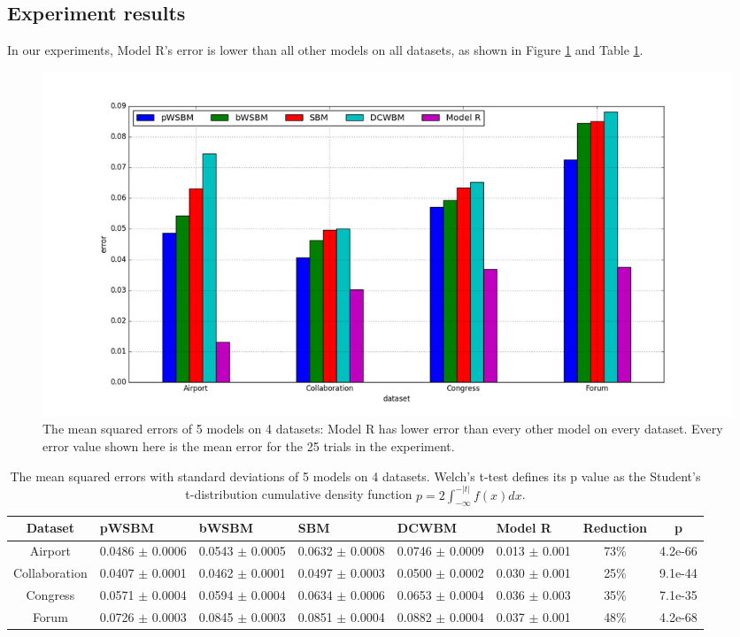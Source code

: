 \documentclass[book,12pt]{WSUThesis}
\theoremstyle{definition}
\begin{document}
\subsection{Experiment results}
In our experiments,
Model R's error is lower than all other models on all datasets,
as shown in Figure \ref{fig:errors} and Table \ref{tab:errors}.
\begin{figure}[!ht]\centering
	\includegraphics[width=1\textwidth]{link-weight-errors}
	\caption{
		The mean squared errors of 5 models on 4 datasets:
		Model R has lower error than every other model on every dataset.
		Every error value shown here is the mean error for the 25 trials in the experiment.
	}
	\label{fig:errors}
\end{figure}
\begin{table}[!htb]\centering
	\caption{
		The mean squared errors with standard deviations of 5 models on 4 datasets.
		Welch's t-test defines its p value as the Student's t-distribution cumulative density function $ p = 2 \int_{-\infty}^{-|t|} f(x) dx $.
	}
	\begin{tabularx}{\textwidth}{|c|X|X|X|X|X|c|c|} \hline \rowcolor{blue!30}
		Dataset & pWSBM & bWSBM & SBM & DCWBM & Model R & Reduction & p \\ \hline
		Airport & 0.0486 $ \pm $ 0.0006 & 0.0543 $ \pm $ 0.0005 & 0.0632 $ \pm $ 0.0008 & 0.0746 $ \pm $ 0.0009 & 0.013 $ \pm $ 0.001 & 73\% & 4.2e-66 \\ \hline
		Collaboration & 0.0407 $ \pm $ 0.0001 & 0.0462 $ \pm $ 0.0001 & 0.0497 $ \pm $ 0.0003 & 0.0500 $ \pm $ 0.0002 & 0.030 $ \pm $ 0.001 & 25\% & 9.1e-44 \\ \hline
		Congress & 0.0571 $ \pm $ 0.0004 & 0.0594 $ \pm $ 0.0004 & 0.0634 $ \pm $ 0.0006 & 0.0653 $ \pm $ 0.0004 & 0.036 $ \pm $ 0.003 & 35\% & 7.1e-35 \\ \hline
		Forum & 0.0726 $ \pm $ 0.0003 & 0.0845 $ \pm $ 0.0003 & 0.0851 $ \pm $ 0.0004 & 0.0882 $ \pm $ 0.0004 & 0.037 $ \pm $ 0.001 & 48\% & 4.2e-68 \\ \hline
	\end{tabularx}
	\label{tab:errors}
\end{table}
\end{document}
